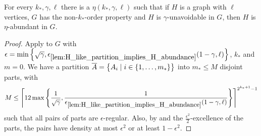         \begin{theorem} \label{thm:property_testing_with_stable_partitions}
            For every $k_*, \gamma, \ell$ there is a $\eta(k_*, \gamma, \ell)$ such that if $H$ is a graph with $\ell$
            vertices, $G$ has the non-$k_*$-order property and $H$ is $\gamma$-unavoidable in $G$, then $H$ is
            $\eta$-abundant in $G$.
            \begin{proof}
                Apply  to $G$ with $\epsilon = \min \left\{ \sqrt{\gamma},
                    \epsilon_{\ref{lem:H_like_partition_implies_H_abundance}} ( 1 - \gamma, \ell ) \right\}$,
                $k_*$ and $m=0$.
                We have a partition $\overline{A} = \bigl\{ A_i \mid i \in \{ 1, \dots, m_* \} \bigr\}$ into $m_* \leq M$
                disjoint parts, with
                \[
                    M \leq \left\lceil 12 \max\left\{ \frac{1}{\sqrt{\gamma}}, \frac{1}{\epsilon_{\ref{lem:H_like_partition_implies_H_abundance}}
                        ( 1 - \gamma, \ell )} \right\} \right\rceil^{2^{k_*+1}-1}
                \]
                such that all pairs of parts are $\epsilon$-regular.
                Also, by  and the $\frac{\epsilon^2}{2}$-excellence of the parts,
                the pairs have density at most $\epsilon^2$ or at least $1 - \epsilon^2$.


\end{proof}
\end{theorem}
